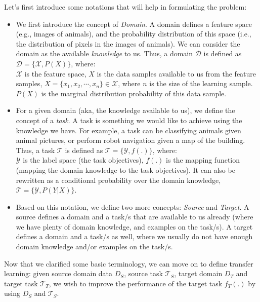   \par Let's first introduce some notations that will help in formulating the problem:
  \begin{itemize}
      \item We first introduce the concept of \textit{Domain}. A domain defines a feature space (e.g., images of animals), and the probability distribution of this space (i.e., the distribution of pixels in the images of animals). We can consider the domain as the available \textit{knowledge} to us. Thus, a domain $\mathcal{D}$ is defined as $\mathcal{D} = \{\mathcal{X}, P(X)\}$, where:\\
      $\mathcal{X}$ is the feature space, $X$ is the data samples available to us from the feature samples, $X = \{x_1,x_2,\cdots,x_n\} \in \mathcal{X}$, where $n$ is the size of the learning sample. $P(X)$ is the marginal distribution probability of this data sample.

      \item For a given domain (aka, the knowledge available to us), we define the concept of a \textit{task}. A task is something we would like to achieve using the knowledge we have. For example, a task can be classifying animals given animal pictures, or perform robot navigation given a map of the building. Thus, a task $\mathcal{T}$ is defined as $\mathcal{T} = \{\mathcal{Y}, f(.)\}$, where:\\
      $\mathcal{Y}$ is the label space (the task objectives), $f(.)$ is the mapping function (mapping the domain knowledge to the task objectives). It can also be rewritten as a conditional probability over the domain knowledge, $\mathcal{T} = \{\mathcal{Y}, P(Y|X)\}$.

      \item Based on this notation, we define two more concepts: \textit{Source} and \textit{Target}. A source defines a domain and a task/s that are available to us already (where we have plenty of domain knowledge, and examples on the task/s). A target defines a domain and a task/s as well, where we usually do not have enough domain knowledge and/or examples on the task/s.
  \end{itemize}

  \par Now that we clarified some basic terminology, we can move on to define transfer learning: given source domain data $D_S$, source task $\mathcal{T}_S$,  target domain $D_T$ and target task $\mathcal{T}_T$, we wish to improve the performance of the target task $f_T(.)$ by using $D_S$ and $\mathcal{T}_S$.

